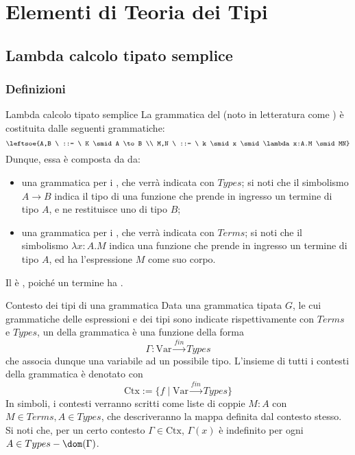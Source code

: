 \documentclass[a4paper, 12pt]{report}
\begin{document}
    \chapter{Elementi di Teoria dei Tipi}

    \section{Lambda calcolo tipato semplice}

    \subsection{Definizioni}

    \begin{frameddefn}{Lambda calcolo tipato semplice}
        La grammatica del  (noto in letteratura come ) è costituita dalle seguenti grammatiche: $$\leftsoe{A,B \ ::= \ K \smid A \to B \\ M,N \ ::= \ k \smid x \smid \lambda x:A.M \smid MN}$$ Dunque, essa è composta da da:

        \begin{itemize}
            \item una grammatica per i , che verrà indicata con $Types$; si noti che il simbolismo $A \to B$ indica il tipo di una funzione che prende in ingresso un termine di tipo $A$, e ne restituisce uno di tipo $B$;
            \item una grammatica per i , che verrà indicata con $Terms$; si noti che il simbolismo $\lambda x: A.M$ indica una funzione che prende in ingresso un termine di tipo $A$, ed ha l'espressione $M$ come suo corpo.
        \end{itemize}

        Il  è , poiché un termine ha .
    \end{frameddefn}

    \begin{frameddefn}{Contesto dei tipi di una grammatica}
        Data una grammatica tipata $G$, le cui grammatiche delle espressioni e dei tipi sono indicate rispettivamente con $Terms$ e $Types$, un  della grammatica  è una funzione della forma $$\Gamma : \mathrm{Var} \stackrel{fin}{\to} Types$$ che associa dunque una variabile ad un possibile tipo. L'insieme di tutti i contesti della grammatica è denotato con $$\mathrm{Ctx} := \{f \mid \mathrm{Var} \stackrel{fin}{\to} Types\}$$ In simboli, i contesti verranno scritti come liste di coppie $M:A$ con $M \in Terms, A \in Types$, che descriveranno la mappa definita dal contesto stesso. Si noti che, per un certo contesto $\Gamma \in \mathrm{Ctx}$, $\Gamma(x)$ è indefinito per ogni $A \in Types - \dom(\Gamma)$.
    \end{frameddefn}
\end{document}

